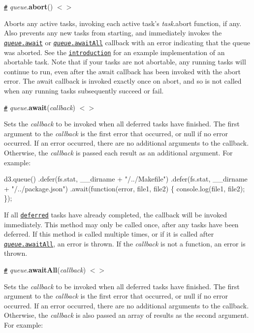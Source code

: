 \href{#queue_abort}{\tt \#} {\itshape queue}.{\bfseries abort}() \href{https://github.com/d3/d3-queue/blob/master/src/queue.js#L29}{\tt $<$$>$}

Aborts any active tasks, invoking each active task’s {\itshape task}.abort function, if any. Also prevents any new tasks from starting, and immediately invokes the \href{#queue_await}{\tt {\itshape queue}.await} or \href{#queue_awaitAll}{\tt {\itshape queue}.await\+All} callback with an error indicating that the queue was aborted. See the \href{#d3-queue}{\tt introduction} for an example implementation of an abortable task. Note that if your tasks are not abortable, any running tasks will continue to run, even after the await callback has been invoked with the abort error. The await callback is invoked exactly once on abort, and so is not called when any running tasks subsequently succeed or fail.

\href{#queue_await}{\tt \#} {\itshape queue}.{\bfseries await}({\itshape callback}) \href{https://github.com/d3/d3-queue/blob/master/src/queue.js#L33}{\tt $<$$>$}

Sets the {\itshape callback} to be invoked when all deferred tasks have finished. The first argument to the {\itshape callback} is the first error that occurred, or null if no error occurred. If an error occurred, there are no additional arguments to the callback. Otherwise, the {\itshape callback} is passed each result as an additional argument. For example\+:


\begin{DoxyCode}
d3.queue()
    .defer(fs.stat, \_\_dirname + "/../Makefile")
    .defer(fs.stat, \_\_dirname + "/../package.json")
    .await(function(error, file1, file2) \{ console.log(file1, file2); \});
\end{DoxyCode}


If all \href{#queue_defer}{\tt deferred} tasks have already completed, the callback will be invoked immediately. This method may only be called once, after any tasks have been deferred. If this method is called multiple times, or if it is called after \href{#queue_awaitAll}{\tt {\itshape queue}.await\+All}, an error is thrown. If the {\itshape callback} is not a function, an error is thrown.

\href{#queue_awaitAll}{\tt \#} {\itshape queue}.{\bfseries await\+All}({\itshape callback}) \href{https://github.com/d3/d3-queue/blob/master/src/queue.js#L39}{\tt $<$$>$}

Sets the {\itshape callback} to be invoked when all deferred tasks have finished. The first argument to the {\itshape callback} is the first error that occurred, or null if no error occurred. If an error occurred, there are no additional arguments to the callback. Otherwise, the {\itshape callback} is also passed an array of results as the second argument. For example\+:


